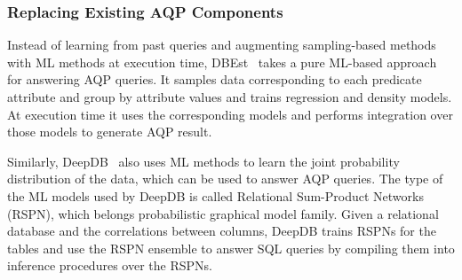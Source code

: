 
\subsubsection{Replacing Existing AQP Components}
Instead of learning from past queries and augmenting sampling-based methods with ML methods at execution time, DBEst~\cite{dbest} takes a pure ML-based approach for answering AQP queries.
It samples data corresponding to each predicate attribute and group by attribute values and trains regression and density models.
At execution time it uses the corresponding models and performs integration over those models to generate AQP result.

Similarly, DeepDB~\cite{deepdb} also uses ML methods to learn the joint probability distribution of the data, which can be used to answer AQP queries.
The type of the ML models used by DeepDB is called Relational Sum-Product Networks (RSPN), which belongs probabilistic graphical model family.
Given a relational database and the correlations between columns, DeepDB trains RSPNs for the tables and use the RSPN ensemble to answer SQL queries by compiling them into inference procedures over the RSPNs.













